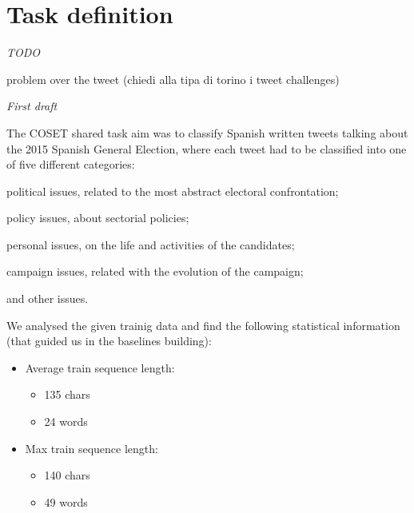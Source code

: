 \section{Task definition} \label{sec:task}

\emph{TODO }

problem over the tweet (chiedi alla tipa di torino i tweet challenges)

\emph{First draft}

The COSET shared task aim was to classify Spanish written tweets talking about the 2015 Spanish General Election, where each tweet had to be classified into one of five different categories:
\begin{enumerate*}
\item political issues, related to the most abstract electoral confrontation; 
\item policy issues, about sectorial policies; 
\item personal issues, on the life and activities of the candidates; 
\item campaign issues, related with the evolution of the campaign;
\item and other issues.
\end{enumerate*}

We analysed the given trainig data and find the following statistical information (that guided us in the baselines building):
\begin{itemize}
\item Average train sequence length:
\begin{itemize}
\item 135 chars 
\item 24 words
\end{itemize}
\item Max train sequence length: 
\begin{itemize}
	\item 140 chars
	\item 49 words
\end{itemize}
\end{itemize}
 



